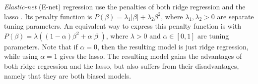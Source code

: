 \documentclass{article}
\newcommand{\argmin}[2]{\underset{#1}{\text{arg min}}\left\{#2\right\}}
\begin{document}

	
	\textit{Elastic-net} (E-net) regression use the penalties of both ridge regression and the lasso \cite{zou2005regularization}. Its penalty function is $P(\beta)=\lambda_1 \vert \beta \vert + \lambda_2 \beta^2$, where $\lambda_1, \lambda_2 > 0$ are separate tuning parameters. An equivalent way to express this penalty function is with $P(\beta) = \lambda((1-\alpha)\beta^2 + \alpha \vert \beta \vert)$, where $\lambda > 0$ and $\alpha \in [0, 1]$ are tuning parameters. Note that if $\alpha = 0$, then the resulting model is just ridge regression, while using $\alpha = 1$ gives the lasso. The resulting model gains the advantages of both ridge regression and the lasso, but also suffers from their disadvantages, namely that they are both biased models.
	
\end{document}
